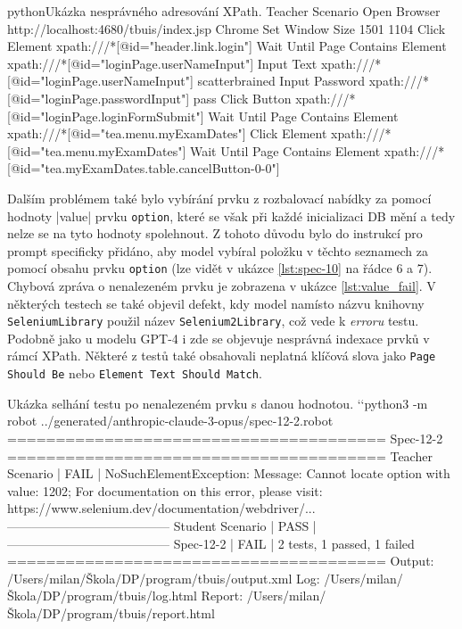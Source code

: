 \documentclass[czech, ma, kiv, he, iso690numb, pdf, viewonly]{fasthesis}
\begin{document}
            \begin{code}{python}{Ukázka nesprávného adresování XPath. \label{lst:invalid_xpath}}
Teacher Scenario
    Open Browser    http://localhost:4680/tbuis/index.jsp    Chrome
    Set Window Size    1501    1104
    Click Element    xpath:///*[@id="header.link.login"]
    Wait Until Page Contains Element    xpath:///*[@id="loginPage.userNameInput"]
    Input Text    xpath:///*[@id="loginPage.userNameInput"]    scatterbrained
    Input Password    xpath:///*[@id="loginPage.passwordInput"]    pass
    Click Button    xpath:///*[@id="loginPage.loginFormSubmit"]
    Wait Until Page Contains Element    xpath:///*[@id="tea.menu.myExamDates"]
    Click Element    xpath:///*[@id="tea.menu.myExamDates"]
    Wait Until Page Contains Element    xpath:///*[@id="tea.myExamDates.table.cancelButton-0-0"]
            \end{code}

            Dalším problémem také bylo vybírání prvku z rozbalovací nabídky za pomocí hodnoty \varb|value| prvku \verb|option|, které se však při každé inicializaci DB mění a tedy nelze se na tyto hodnoty spolehnout. Z tohoto důvodu bylo do instrukcí pro prompt specificky přidáno, aby model vybíral položku v těchto seznamech za pomocí obsahu prvku \verb|option| (lze vidět v ukázce \ref{lst:spec-10} na řádce 6 a 7). Chybová zpráva o nenalezeném prvku je zobrazena v ukázce \ref{lst:value_fail}. V některých testech se také objevil defekt, kdy model namísto názvu knihovny \verb|SeleniumLibrary| použil název \verb|Selenium2Library|, což vede k \textit{erroru} testu. Podobně jako u modelu GPT-4 i zde se objevuje nesprávná indexace prvků v rámcí XPath. Některé z testů také obsahovali neplatná klíčová slova jako \verb|Page Should Be| nebo \verb|Element Text Should Match|.

            \begin{console}{Ukázka selhání testu po nenalezeném prvku s danou hodnotou. \label{lst:value_fail}}
`\uxprompt`python3 -m robot ../generated/anthropic-claude-3-opus/spec-12-2.robot
=======================================
Spec-12-2
=======================================
Teacher Scenario                | FAIL |
NoSuchElementException: Message: Cannot locate option with value: 1202; For documentation on this error, please visit: https://www.selenium.dev/documentation/webdriver/...
---------------------------------------
Student Scenario                | PASS |
---------------------------------------
Spec-12-2                       | FAIL |
2 tests, 1 passed, 1 failed
=======================================
Output:  /Users/milan/Škola/DP/program/tbuis/output.xml
Log:     /Users/milan/Škola/DP/program/tbuis/log.html
Report:  /Users/milan/Škola/DP/program/tbuis/report.html
            \end{console}
\end{document}

